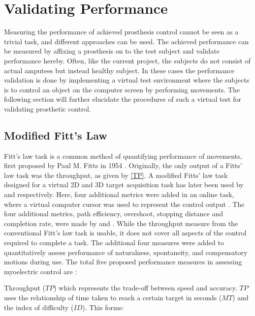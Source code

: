
\section{Validating Performance} \label{sec:fitts}

Measuring the performance of achieved prosthesis control cannot be seen as a trivial task, and different approaches can be used. The achieved performance can be measured by affixing a prosthesis on to the test subject and validate performance hereby. Often, like the current project, the subjects do not consist of actual amputees but instead healthy subject. In these cases the performance validation is done by implementing a virtual test environment where the subjects is to control an object on the computer screen by performing movements. The following section will further elucidate the procedures of such a virtual test for validating prosthetic control.      


\subsection{Modified Fitt's Law}

 Fitt's law task is a common method of quantifying performance of movements, first proposed by Paul M. Fitts in 1954 \cite{Fitts1954}. Originally, the only output of a Fitts' law task was the throughput, as given by \eqref{TP}. A modified Fitts' law task designed for a virtual 2D and 3D target acquisition task has later been used by \cite{Kamavuako2014} and \cite{Scheme2013} respectively. Here, four additional metrics were added in an online task, where a virtual computer cursor was used to represent the control output \cite{Scheme2013, Kamavuako2014}. The four additional metrics, path efficiency, overshoot, stopping distance and completion rate, were made by \cite{Poulton2013} and \cite{ Simon2011}. While the throughput measure from the conventional Fitt's law task is usable, it does not cover all aspects of the control required to complete a task. The additional four measures were added to quantitatively assess performance of naturalness, spontaneity, and compensatory motions during use. The total five proposed performance measures in assessing myoelectric control are \cite{Scheme2013a}: 

Throughput ($TP$) which represents the trade-off between speed and accuracy. $TP$ uses the relationship of time taken to reach a certain target in seconds ($MT$) and the index of difficulty ($ID$). This forms: \cite{Scheme2013,Fitts1954}
	
